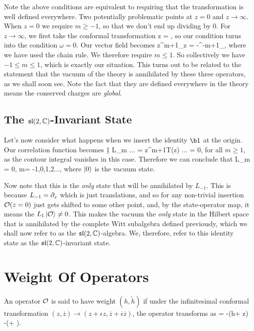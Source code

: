 Note the above conditions are equivalent to requiring that the transformation is well defined everywhere. Two potentially problematic points at $z=0$ and $z\to\infty$. When $z=0$ we require $m\geq-1$, so that we don't end up dividing by $0$. For $z\to\infty$, we first take the conformal transformation
\bse 
    z = ,
\ese 
so our condition turns into the condition $\omega=0$. Our vector field becomes 
\bse 
    z^{m+1}\p_z = -\omega^{-m+1}\p_{\omega},
\ese 
where we have used the chain rule. We therefore require $m \leq 1$. So collectively we have $-1\leq m \leq 1$, which is exactly our situation. This turns out to be related to the statement that the vacuum of the theory is annihilated by these three operators, as we shall soon see. Note the fact that they are defined everywhere in the theory means the conserved charges are \textit{global}. 

\subsection{The $\mathfrak{sl}(2,\mathbb{C})$-Invariant State}

Let's now consider what happens when we insert the identity $\b1$ at the origin. Our correlation function becomes
\bse 
    \langle \b1 L_m ... \rangle = \int \oint {} z^{m+1}T(z) ... = 0,
\ese 
for all $m\geq 1$, as the contour integral vanishes in this case. Therefore we can conclude that 
\be 
    L_m = 0, \qquad \forall m= -1,0,1,2...,
\ee 
where $\ket{0}$ is the vacuum state. 

Now note that this is the \textit{only} state that will be annihilated by $L_{-1}$. This is because $L_{-1}=\partial_z$ which is just translations, and so for any non-trivial insertion $\mathcal{O}(z=0)$ just gets shifted to some other point, and, by the state-operator map, it means the $L_1\ket{\mathcal{O}}\neq 0$. This makes the vacuum the \textit{only} state in the Hilbert space that is annihilated by the complete Witt subalgebra defined previously, which we shall now refer to as the $\mathfrak{sl}(2,\mathbb{C})$-algebra. We, therefore, refer to this identity state as the $\mathfrak{sl}(2,\mathbb{C})$-invariant state.


\section{Weight Of Operators}

    An operator $\mathcal{O}$ is said to have weight $(h,\widetilde{h})$ if under the infinitesimal conformal transformation $(z,\overline{z}) \to (z + \epsilon z, \overline{z} + \overline{\epsilon}\overline{z})$, the operator transforms as
    \be 
    \label{eqn:WeightOfOperator}
        \del \cO = -\epsilon(h\cO + z\p\cO) -\overline{\epsilon}(\cO + \overline{\p}\cO).
    \ee 
\ed 


